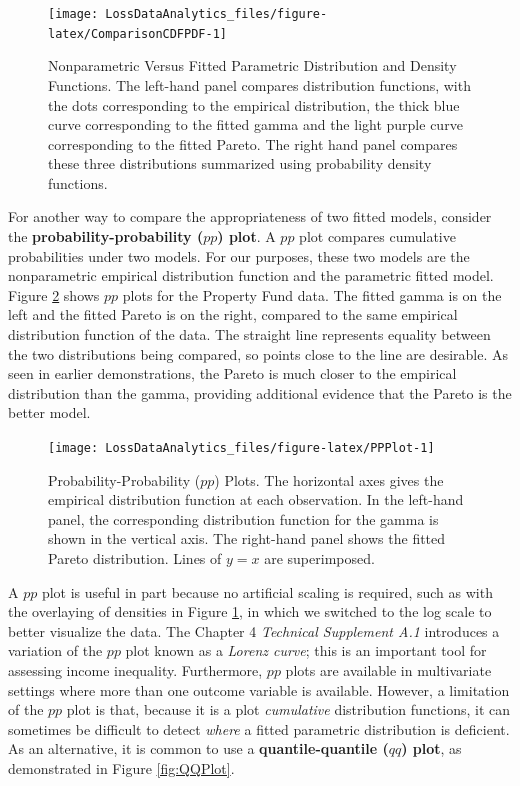 \documentclass[]{book}
\theoremstyle{definition}
\theoremstyle{definition}
\theoremstyle{definition}
\theoremstyle{remark}
\begin{document}
\begin{figure}

{\centering \texttt{[image: LossDataAnalytics\_files/figure-latex/ComparisonCDFPDF-1]} 

}

\caption{Nonparametric Versus Fitted Parametric Distribution and Density Functions. The left-hand panel compares distribution functions, with the dots corresponding to the empirical distribution, the thick blue curve corresponding to the fitted gamma and the light purple curve corresponding to the fitted Pareto. The right hand panel compares these three distributions summarized using probability density functions.}\label{fig:ComparisonCDFPDF}
\end{figure}

For another way to compare the appropriateness of two fitted models,
consider the \textbf{probability-probability (\(pp\)) plot}. A \(pp\)
plot compares cumulative probabilities under two models. For our
purposes, these two models are the nonparametric empirical distribution
function and the parametric fitted model. Figure \ref{fig:PPPlot} shows
\(pp\) plots for the Property Fund data. The fitted gamma is on the left
and the fitted Pareto is on the right, compared to the same empirical
distribution function of the data. The straight line represents equality
between the two distributions being compared, so points close to the
line are desirable. As seen in earlier demonstrations, the Pareto is
much closer to the empirical distribution than the gamma, providing
additional evidence that the Pareto is the better model.

\begin{figure}

{\centering \texttt{[image: LossDataAnalytics\_files/figure-latex/PPPlot-1]} 

}

\caption{Probability-Probability ($pp$) Plots. The horizontal axes gives the empirical distribution function at each observation. In the left-hand panel, the corresponding distribution function for the gamma is shown in the vertical axis. The right-hand panel shows the fitted Pareto distribution. Lines of $y=x$ are superimposed.}\label{fig:PPPlot}
\end{figure}

A \(pp\) plot is useful in part because no artificial scaling is
required, such as with the overlaying of densities in Figure
\ref{fig:ComparisonCDFPDF}, in which we switched to the log scale to
better visualize the data. The Chapter 4 \emph{Technical Supplement A.1}
introduces a variation of the \(pp\) plot known as a \emph{Lorenz
curve}; this is an important tool for assessing income inequality.
Furthermore, \(pp\) plots are available in multivariate settings where
more than one outcome variable is available. However, a limitation of
the \(pp\) plot is that, because it is a plot \emph{cumulative}
distribution functions, it can sometimes be difficult to detect
\emph{where} a fitted parametric distribution is deficient. As an
alternative, it is common to use a \textbf{quantile-quantile (\(qq\))
plot}, as demonstrated in Figure \ref{fig:QQPlot}.
\end{document}
